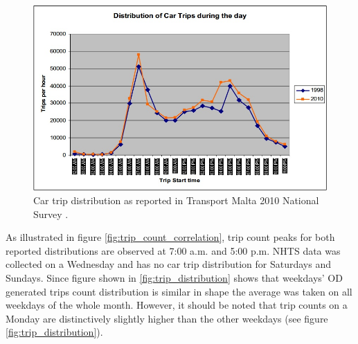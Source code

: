 \documentclass[12pt, a4paper]{report}
\theoremstyle{definition}
\theoremstyle{definition}%
\theoremstyle{definition}%
\theoremstyle{definition}%
\theoremstyle{definition}%
\theoremstyle{definition}%
\begin{document}
\begin{figure}[!]	
	\includegraphics[scale=0.6]{Transport_malta_trip_distribution.jpg}
	\centering
	\caption[NHTS car trip distribution]{Car trip distribution as reported in Transport Malta 2010 National Survey \cite{malta2011national}.}
	\label{fig:trip_distribution_nso}
\end{figure}

As illustrated in figure \ref{fig:trip_count_correlation}, trip count peaks for both reported distributions are observed at 7:00 a.m. and 5:00 p.m. NHTS data was collected on a Wednesday and has no car trip distribution for Saturdays and Sundays. Since figure shown in \ref{fig:trip_distribution} shows that weekdays' OD generated trips count distribution is similar in shape the average was taken on all weekdays of the whole month. However, it should be noted that trip counts on a Monday are distinctively slightly higher than the other weekdays (see figure \ref{fig:trip_distribution}). 


\begin{table}[!] 	
	\centering
	\caption[NHTS and OD trip distributions correlation statistics]{NHTS and OD trip distributions proved to be highly correlated. $ ^* p < 0.001$  } 
	\label{table:trip_dsitribution_statistical_analysis}	
\end{table}
\end{document}
